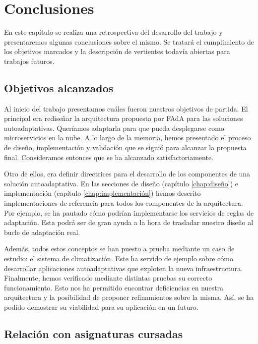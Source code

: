 \chapter{Conclusiones}
\label{chap:conclusiones}

En este capítulo se realiza una retrospectiva del desarrollo del trabajo y presentaremos algunas conclusiones sobre el mismo. Se tratará el cumplimiento de los objetivos marcados y la descripción de vertientes todavía abiertas para trabajos futuros.

\section{Objetivos alcanzados}

Al inicio del trabajo presentamos cuáles fueron nuestros objetivos de partida. El principal era rediseñar la arquitectura propuesta por FAdA para las soluciones autoadaptativas. Queríamos adaptarla para que pueda desplegarse como microservicios en la nube. A lo largo de la memoria, hemos presentado el proceso de diseño, implementación y validación que se siguió para alcanzar la propuesta final. Consideramos entonces que se ha alcanzado satisfactoriamente.

Otro de ellos, era definir directrices para el desarrollo de los componentes de una solución autoadaptativa. En las secciones de diseño (capítulo \ref{chap:diseño}) e implementación (capítulo \ref{chap:implementación}) hemos descrito implementaciones de referencia para todos los componentes de la arquitectura. Por ejemplo, se ha pautado cómo podrían implementarse los servicios de reglas de adaptación. Esta podrá ser de gran ayuda a la hora de trasladar nuestro diseño al bucle de adaptación real.

Además, todos estos conceptos se han puesto a prueba mediante un caso de estudio: el sistema de climatización. Este ha servido de ejemplo sobre cómo desarrollar aplicaciones autoadaptativas que exploten la nueva infraestructura. Finalmente, hemos verificado mediante distintas pruebas su correcto funcionamiento. Esto nos ha permitido encontrar deficiencias en nuestra arquitectura y la posibilidad de proponer refinamientos sobre la misma. Así, se ha podido demostrar su viabilidad para su aplicación en un futuro.

\section{Relación con asignaturas cursadas}

